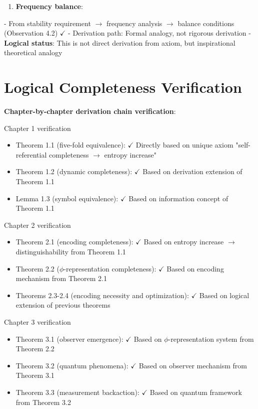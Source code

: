\begin{enumerate}
\item \textbf{Frequency balance}:
\end{enumerate}
   - From stability requirement $\rightarrow$ frequency analysis $\rightarrow$ balance conditions (Observation 4.2) $\checkmark$
   - Derivation path: Formal analogy, not rigorous derivation
   - \textbf{Logical status}: This is not direct derivation from axiom, but inspirational theoretical analogy

\section{Logical Completeness Verification}
\label{sec:ch08_completeness:logical-completeness-verification}

\textbf{Chapter-by-chapter derivation chain verification}:

Chapter 1 verification
\begin{itemize}
\item Theorem 1.1 (five-fold equivalence): $\checkmark$ Directly based on unique axiom "self-referential completeness $\rightarrow$ entropy increase"
\item Theorem 1.2 (dynamic completeness): $\checkmark$ Based on derivation extension of Theorem 1.1
\item Lemma 1.3 (symbol equivalence): $\checkmark$ Based on information concept of Theorem 1.1
\end{itemize}

Chapter 2 verification
\begin{itemize}
\item Theorem 2.1 (encoding completeness): $\checkmark$ Based on entropy increase $\rightarrow$ distinguishability from Theorem 1.1
\item Theorem 2.2 ($\phi$-representation completeness): $\checkmark$ Based on encoding mechanism from Theorem 2.1
\item Theorems 2.3-2.4 (encoding necessity and optimization): $\checkmark$ Based on logical extension of previous theorems
\end{itemize}

Chapter 3 verification
\begin{itemize}
\item Theorem 3.1 (observer emergence): $\checkmark$ Based on $\phi$-representation system from Theorem 2.2
\item Theorem 3.2 (quantum phenomena): $\checkmark$ Based on observer mechanism from Theorem 3.1
\item Theorem 3.3 (measurement backaction): $\checkmark$ Based on quantum framework from Theorem 3.2
\end{itemize}

